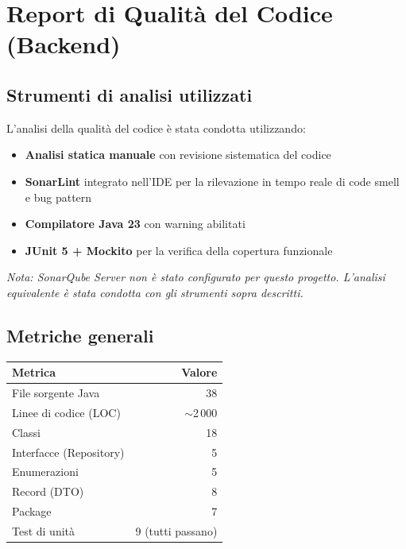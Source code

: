 
\section{Report di Qualità del Codice (Backend)}

\subsection{Strumenti di analisi utilizzati}

L'analisi della qualità del codice è stata condotta utilizzando:
\begin{itemize}
    \item \textbf{Analisi statica manuale} con revisione sistematica del codice
    \item \textbf{SonarLint} integrato nell'IDE per la rilevazione in tempo reale
          di code smell e bug pattern
    \item \textbf{Compilatore Java 23} con warning abilitati
    \item \textbf{JUnit 5 + Mockito} per la verifica della copertura funzionale
\end{itemize}

\emph{Nota: SonarQube Server non è stato configurato per questo progetto.
L'analisi equivalente è stata condotta con gli strumenti sopra descritti.}

\subsection{Metriche generali}

\begin{center}
\begin{tabular}{|l|r|}
\hline
\textbf{Metrica} & \textbf{Valore} \\
\hline
File sorgente Java & 38 \\
\hline
Linee di codice (LOC) & $\sim$2\,000 \\
\hline
Classi & 18 \\
\hline
Interfacce (Repository) & 5 \\
\hline
Enumerazioni & 5 \\
\hline
Record (DTO) & 8 \\
\hline
Package & 7 \\
\hline
Test di unità & 9 (tutti passano) \\
\hline
\end{tabular}
\end{center}


